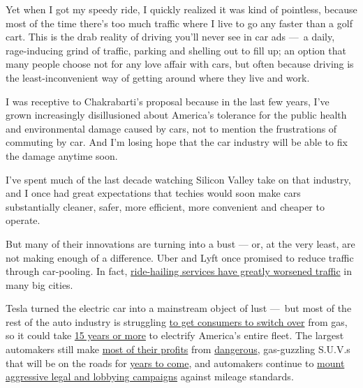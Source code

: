 Yet when I got my speedy ride, I quickly realized it was kind of
pointless, because most of the time there's too much traffic where I
live to go any faster than a golf cart. This is the drab reality of
driving you'll never see in car ads ---~a daily, rage-inducing grind of
traffic, parking and shelling out to fill up; an option that many people
choose not for any love affair with cars, but often because driving is
the least-inconvenient way of getting around where they live and work.

I was receptive to Chakrabarti's proposal because in the last few years,
I've grown increasingly disillusioned about America's tolerance for the
public health and environmental damage caused by cars, not to mention
the frustrations of commuting by car. And I'm losing hope that the car
industry will be able to fix the damage anytime soon.

I've spent much of the last decade watching Silicon Valley take on that
industry, and I once had great expectations that techies would soon make
cars substantially cleaner, safer, more efficient, more convenient and
cheaper to operate.

But many of their innovations are turning into a bust --- or, at the
very least, are not making enough of a difference. Uber and Lyft once
promised to reduce traffic through car-pooling. In fact,
\href{https://www.theverge.com/2019/8/6/20756945/uber-lyft-tnc-vmt-traffic-congestion-study-fehr-peers}{ride-hailing
services have greatly worsened traffic} in many big cities.

Tesla turned the electric car into a mainstream object of lust ---~but
most of the rest of the auto industry is struggling
\href{https://www.marketwatch.com/story/teslas-competitors-find-that-going-electric-has-its-own-set-of-problems-2019-11-04}{to
get consumers to switch over} from gas, so it could take
\href{http://energyfuse.org/americas-aging-vehicles-delay-rate-fleet-turnover/}{15
years or more} to electrify America's entire fleet. The largest
automakers still make
\href{https://www.nytimes3xbfgragh.onion/2019/09/12/business/suv-sedan-detroit-fight.html}{most
of their profits} from
\href{https://www.curbed.com/2018/9/27/17909270/pedestrian-deaths-suv-car-design}{dangerous},
gas-guzzling S.U.V.s that will be on the roads for
\href{http://energyfuse.org/americas-aging-vehicles-delay-rate-fleet-turnover/}{years
to come}, and automakers continue to
\href{https://www.latimes.com/business/story/2019-10-31/epa-trump-emissions-lawsuit}{mount
aggressive legal and lobbying campaigns} against mileage standards.

